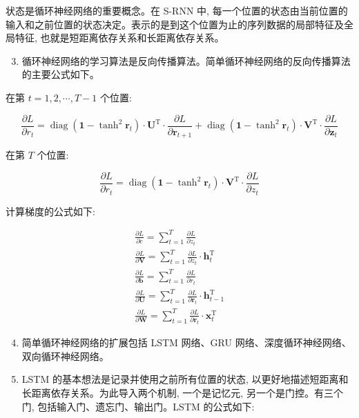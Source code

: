 \documentclass[10pt]{article}
\begin{document}
状态是循环神经网络的重要概念。在 S-RNN 中, 每一个位置的状态由当前位置的输入和之前位置的状态决定。表示的是到这个位置为止的序列数据的局部特征及全局特征, 也就是短距离依存关系和长距离依存关系。

\begin{enumerate}
  \setcounter{enumi}{2}
  \item 循环神经网络的学习算法是反向传播算法。简单循环神经网络的反向传播算法的主要公式如下。
\end{enumerate}

在第 $t=1,2, \cdots, T-1$ 个位置:

$$
\frac{\partial L}{\partial r_{t}}=\operatorname{diag}\left(\boldsymbol{1}-\tanh ^{2} \boldsymbol{r}_{t}\right) \cdot \boldsymbol{U}^{\mathrm{T}} \cdot \frac{\partial L}{\partial \boldsymbol{r}_{t+1}}+\operatorname{diag}\left(\boldsymbol{1}-\tanh ^{2} \boldsymbol{r}_{t}\right) \cdot \boldsymbol{V}^{\mathrm{T}} \cdot \frac{\partial L}{\partial \boldsymbol{z}_{t}}
$$

在第 $T$ 个位置:

$$
\frac{\partial L}{\partial r_{t}}=\operatorname{diag}\left(\boldsymbol{1}-\tanh ^{2} \boldsymbol{r}_{t}\right) \cdot \boldsymbol{V}^{\mathrm{T}} \cdot \frac{\partial L}{\partial z_{t}}
$$

计算梯度的公式如下:

$$
\begin{gathered}
\frac{\partial L}{\partial c}=\sum_{t=1}^{T} \frac{\partial L}{\partial z_{t}} \\
\frac{\partial L}{\partial \boldsymbol{V}}=\sum_{t=1}^{T} \frac{\partial L}{\partial z_{t}} \cdot \boldsymbol{h}_{t}^{\mathrm{T}} \\
\frac{\partial L}{\partial \boldsymbol{b}}=\sum_{t=1}^{T} \frac{\partial L}{\partial r_{t}} \\
\frac{\partial L}{\partial \boldsymbol{U}}=\sum_{t=1}^{T} \frac{\partial L}{\partial \boldsymbol{r}_{t}} \cdot \boldsymbol{h}_{t-1}^{\mathrm{T}} \\
\frac{\partial L}{\partial \boldsymbol{W}}=\sum_{t=1}^{T} \frac{\partial L}{\partial \boldsymbol{r}_{t}} \cdot \boldsymbol{x}_{t}^{\mathrm{T}}
\end{gathered}
$$

\begin{enumerate}
  \setcounter{enumi}{3}
  \item 简单循环神经网络的扩展包括 LSTM 网络、GRU 网络、深度循环神经网络、双向循环神经网络。

  \item LSTM 的基本想法是记录并使用之前所有位置的状态, 以更好地描述短距离和长距离依存关系。为此导入两个机制, 一个是记忆元, 另一个是门控。有三个门, 包括输入门、遗忘门、输出门。LSTM 的公式如下:

\end{enumerate}
\end{document}
